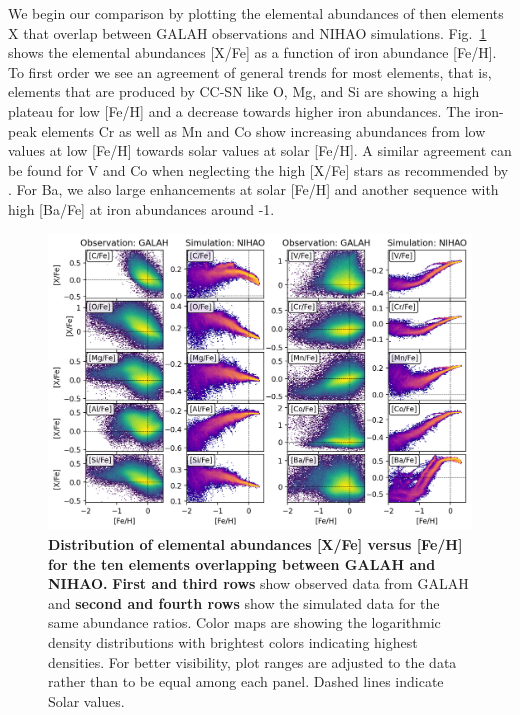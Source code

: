 \documentclass[fleqn,usenatbib]{mnras}
\begin{document}
We begin our comparison by plotting the elemental abundances of then elements X that overlap between GALAH observations and NIHAO simulations. Fig.~\ref{fig:FeH_XFe} shows the elemental abundances [X/Fe] as a function of iron abundance [Fe/H]. To first order we see an agreement of general trends for most elements, that is, elements that are produced by CC-SN like O, Mg, and Si are showing a high plateau for low [Fe/H] and a decrease towards higher iron abundances. The iron-peak elements Cr as well as Mn and Co show increasing abundances from low values at low [Fe/H] towards solar values at solar [Fe/H]. A similar agreement can be found for V and Co when neglecting the high [X/Fe] stars as recommended by \citet{Buder2021}. For Ba, we also large enhancements at solar [Fe/H] and another sequence with high [Ba/Fe] at iron abundances around -1.

\begin{figure}
	\includegraphics[width=\textwidth]{figures/Overview_FeH_XFe_Obs_Sim.png}
    \caption{
    \textbf{Distribution of elemental abundances [X/Fe] versus [Fe/H] for the ten elements overlapping between GALAH and NIHAO.} 
    \textbf{First and third rows} show observed data from GALAH and \textbf{second and fourth rows} show the simulated data for the same abundance ratios. Color maps are showing the logarithmic density distributions with brightest colors indicating highest densities. For better visibility, plot ranges are adjusted to the data rather than to be equal among each panel. Dashed lines indicate Solar values.}
    \label{fig:FeH_XFe}
\end{figure}
\end{document}

